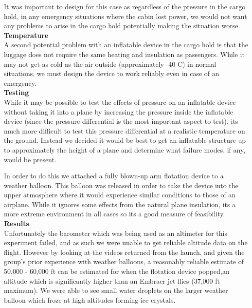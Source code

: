 It was important to design for this case as regardless of the pressure in the cargo hold, in any emergency situations where the cabin lost power, we would not want any problems to arise in the cargo hold potentially making the situation worse.\\

\noindent\textbf{Temperature}\\
A second potential problem with an inflatable device in the cargo hold is that the luggage does not require the same heating and insulation as passengers. While it may not get as cold as the air outside (approximately -40 C) in normal situations, we must design the device to work reliably even in case of an emergency. \\

\noindent\textbf{Testing}\\
While it may  be possible to test the effects of pressure on an inflatable device without taking it into a plane by increasing the pressure inside the inflatable device (since the pressure differential is the most important aspect to test), its much more difficult to test this pressure differential at a realistic temperature on the ground. Instead we decided it would be best to get an inflatable structure up to approximately the height of a plane and determine what failure modes, if any, would be present. 

In order to do this we attached a fully blown-up arm flotation device to a weather balloon. This balloon was released in order to take the device into the upper atmosphere where it would experience similar conditions to those of an airplane. While it ignores some effects from the natural plane insulation, its a more extreme environment in all cases so its a good measure of feasibility. \\

\noindent\textbf{Results}\\
Unfortunately the barometer which was being used as an altimeter for this experiment failed, and as such we were unable to get reliable altitude data on the flight. However by looking at the videos returned from the launch, and given the group's prior experience with weather balloons, a reasonably reliable estimate of 50,000 - 60,000 ft can be estimated for when the flotation device popped,an altitude which is significantly higher than an Embraer jet flies (37,000 ft maximum). We were able to see small water droplets on the larger weather balloon which froze at high altitudes forming ice crystals.

